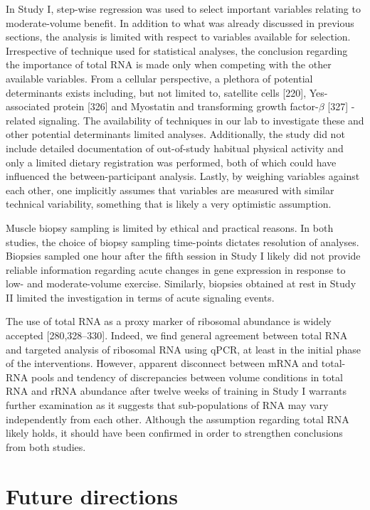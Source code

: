\documentclass[twoside,10pt]{gihclass} %
\begin{document}
In Study I, step-wise regression was used to select important variables relating to moderate-volume benefit. In addition to what was already discussed in previous sections, the analysis is limited with respect to variables available for selection. Irrespective of technique used for statistical analyses, the conclusion regarding the importance of total RNA is made only when competing with the other available variables. From a cellular perspective, a plethora of potential determinants exists including, but not limited to,
satellite cells {[}220{]},
Yes-associated protein {[}326{]} and
Myostatin and transforming growth factor-\(\beta\) {[}327{]}
-related signaling. The availability of techniques in our lab to investigate these and other potential determinants limited analyses.
Additionally, the study did not include detailed documentation of out-of-study habitual physical activity and only a limited dietary registration was performed, both of which could have influenced the between-participant analysis.
Lastly, by weighing variables against each other, one implicitly assumes that variables are measured with similar technical variability, something that is likely a very optimistic assumption.

Muscle biopsy sampling is limited by ethical and practical reasons. In both studies, the choice of biopsy sampling time-points dictates resolution of analyses. Biopsies sampled one hour after the fifth session in Study I likely did not provide reliable information regarding acute changes in gene expression in response to low- and moderate-volume exercise. Similarly, biopsies obtained at rest in Study II limited the investigation in terms of acute signaling events.

The use of total RNA as a proxy marker of ribosomal abundance is widely accepted
{[}280,328--330{]}.
Indeed, we find general agreement between total RNA and targeted analysis of ribosomal RNA using qPCR, at least in the initial phase of the interventions. However, apparent disconnect between mRNA and total-RNA pools and tendency of discrepancies between volume conditions in total RNA and rRNA abundance after twelve weeks of training in Study I warrants further examination as it suggests that sub-populations of RNA may vary independently from each other. Although the assumption regarding total RNA likely holds, it should have been confirmed in order to strengthen conclusions from both studies.

\hypertarget{future-directions}{%
\section{Future directions}\label{future-directions}}
\end{document}

